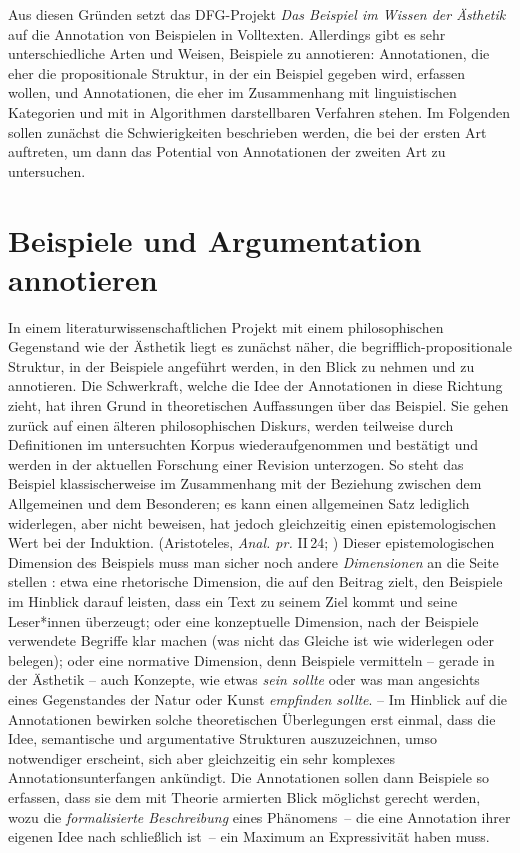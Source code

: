 \documentclass{article}
\renewcommand*{\see}{\autocap{v}gl\adddot}%
\begin{document}
Aus diesen Gründen setzt das DFG-Projekt \textit{Das Beispiel im
  Wissen der Ästhetik} auf die Annotation von Beispielen in
Volltexten. Allerdings gibt es sehr unterschiedliche Arten und Weisen,
Beispiele zu annotieren: Annotationen, die eher die propositionale
Struktur, in der ein Beispiel gegeben wird, erfassen wollen, und
Annotationen, die eher im Zusammenhang mit linguistischen Kategorien
und mit in Algorithmen darstellbaren Verfahren stehen. Im Folgenden
sollen zunächst die Schwierigkeiten beschrieben werden, die bei der
ersten Art auftreten, um dann das Potential von Annotationen der
zweiten Art zu untersuchen.

\section{Beispiele und Argumentation annotieren}


In einem literaturwissenschaftlichen Projekt mit einem philosophischen
Gegenstand wie der Ästhetik liegt es zunächst näher, die
begrifflich-propositionale Struktur, in der Beispiele angeführt
werden, in den Blick zu nehmen und zu annotieren. Die Schwerkraft,
welche die Idee der Annotationen in diese Richtung zieht, hat ihren
Grund in theoretischen Auffassungen über das Beispiel. Sie gehen
zurück auf einen älteren philosophischen Diskurs, werden teilweise
durch Definitionen im untersuchten Korpus wiederaufgenommen und
bestätigt und werden in der aktuellen Forschung einer Revision
unterzogen. So steht das Beispiel klassischerweise im Zusammenhang mit
der Beziehung zwischen dem Allgemeinen und dem Besonderen; es kann
einen allgemeinen Satz lediglich widerlegen, aber nicht beweisen, hat
jedoch gleichzeitig einen epistemologischen Wert bei der Induktion. %
(Aristoteles, \emph{Anal. pr.} II\,24; \cite[\see][]{Willer2007a}) %
Dieser epistemologischen Dimension des Beispiels muss man sicher noch
andere \emph{Dimensionen} an die Seite stellen \parencite{CL2013b}:
etwa eine rhetorische Dimension, die auf den Beitrag zielt, den
Beispiele im Hinblick darauf leisten, dass ein Text zu seinem Ziel
kommt und seine Leser*innen überzeugt; oder eine konzeptuelle
Dimension, nach der Beispiele verwendete Begriffe klar machen (was
nicht das Gleiche ist wie widerlegen oder belegen); oder eine
normative Dimension, denn Beispiele vermitteln -- gerade in der
Ästhetik -- auch Konzepte, wie etwas \emph{sein sollte} oder was man
angesichts eines Gegenstandes der Natur oder Kunst \emph{empfinden
  sollte}. -- Im Hinblick auf die Annotationen bewirken solche
theoretischen Überlegungen erst einmal, dass die Idee, semantische und
argumentative Strukturen auszuzeichnen, umso notwendiger erscheint,
sich aber gleichzeitig ein sehr komplexes Annotationsunterfangen
ankündigt. Die Annotationen sollen dann Beispiele so erfassen, dass
sie dem mit Theorie armierten Blick möglichst gerecht werden, wozu die
\emph{formalisierte Beschreibung} eines Phänomens~-- die eine
Annotation ihrer eigenen Idee nach schließlich ist~-- ein Maximum an
Expressivität haben muss.
\end{document}
